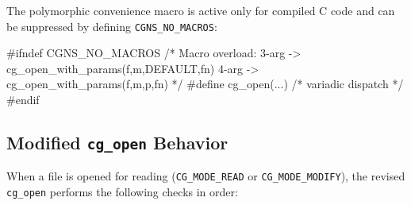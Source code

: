 \documentclass[11pt,letterpaper]{article}
\makeatletter
\let\cgns@orig@lstlisting\lstlisting
\let\cgns@endorig@lstlisting\endlstlisting
\renewenvironment{lstlisting}
  {\par\needspace{5\baselineskip}\nolinenumbers\cgns@orig@lstlisting}
  {\cgns@endorig@lstlisting\par\linenumbers}
\makeatother
\begin{document}
The polymorphic convenience macro is active only for compiled C
code and can be suppressed by defining \texttt{CGNS\_NO\_MACROS}:

\begin{lstlisting}[language=C]
#ifndef CGNS_NO_MACROS
  /* Macro overload: 3-arg -> cg_open_with_params(f,m,DEFAULT,fn)
     4-arg -> cg_open_with_params(f,m,p,fn) */
  #define cg_open(...) /* variadic dispatch */
#endif
\end{lstlisting}

\subsection{Modified \texttt{cg\_open} Behavior}

When a file is opened for reading (\texttt{CG\_MODE\_READ} or
\texttt{CG\_MODE\_MODIFY}), the revised \texttt{cg\_open} performs
the following checks in order:
\end{document}
